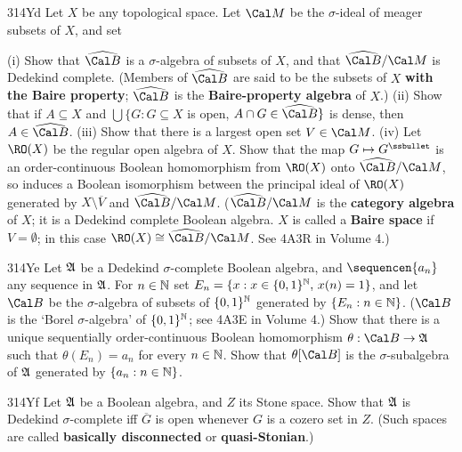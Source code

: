 {\spheader 314Yd Let $X$ be any topological space.
Let $\Cal M$ be the $\sigma$-ideal of meager subsets of $X$, and set


\noindent (i) Show that $\widehat{\Cal B}$ is a $\sigma$-algebra of
subsets of $X$,
and that $\widehat{\Cal B}/\Cal M$ is Dedekind complete.   (Members of
$\widehat{\Cal B}$
are said to be the subsets of $X$ {\bf with the Baire property};
$\widehat{\Cal B}$ is the {\bf Baire-property algebra} of $X$.)
(ii) Show that if $A\subseteq X$ and $\bigcup\{G:G\subseteq X$ is open,
$A\cap G\in\widehat{\Cal B}\}$ is dense, then $A\in\widehat{\Cal B}$.
(iii) Show that there is a largest open set $V\in\Cal M$.   (iv) Let
$\RO(X)$ be the regular open algebra of $X$.   Show that the map
$G\mapsto G^{\ssbullet}$ is an order-continuous Boolean homomorphism
from $\RO(X)$ onto $\widehat{\Cal B}/\Cal M$, so induces a Boolean
isomorphism between
the principal ideal of $\RO(X)$ generated by $X\setminus\overline{V}$
and $\widehat{\Cal B}/\Cal M$.   ($\widehat{\Cal B}/\Cal M$ is the
{\bf category algebra} of $X$;  it is a Dedekind complete Boolean
algebra.   $X$ is called a {\bf Baire space} if
$V=\emptyset$;  in this case $\RO(X)\cong\widehat{\Cal B}/\Cal M$.
See 4A3R in Volume 4.)

\spheader 314Ye Let $\frak A$ be a Dedekind $\sigma$-complete Boolean
algebra, and $\sequencen{a_n}$ any sequence in $\frak A$.   For
$n\in\Bbb N$ set $E_n=\{x:x\in\{0,1\}^{\Bbb N},\,x(n)=1\}$, and let
$\Cal B$ be the $\sigma$-algebra of subsets of $\{0,1\}^{\Bbb N}$
generated by $\{E_n:n\in\Bbb N\}$.   ($\Cal B$ is the `Borel
$\sigma$-algebra' of $\{0,1\}^{\Bbb N}$;  see 4A3E in Volume 4.)
Show that there is a unique sequentially order-continuous Boolean
homomorphism
$\theta:\Cal B\to\frak A$ such that $\theta(E_n)=a_n$ for every
$n\in\Bbb N$.      Show that $\theta[\Cal B]$ is the $\sigma$-subalgebra of
$\frak A$ generated by $\{a_n:n\in\Bbb N\}$.

\spheader 314Yf Let $\frak A$ be a Boolean algebra, and $Z$ its
Stone space.   Show that $\frak A$ is Dedekind $\sigma$-complete iff
$\overline{G}$ is open whenever $G$ is a cozero set in $Z$.   (Such
spaces are called {\bf basically disconnected} or {\bf quasi-Stonian}.)

}
